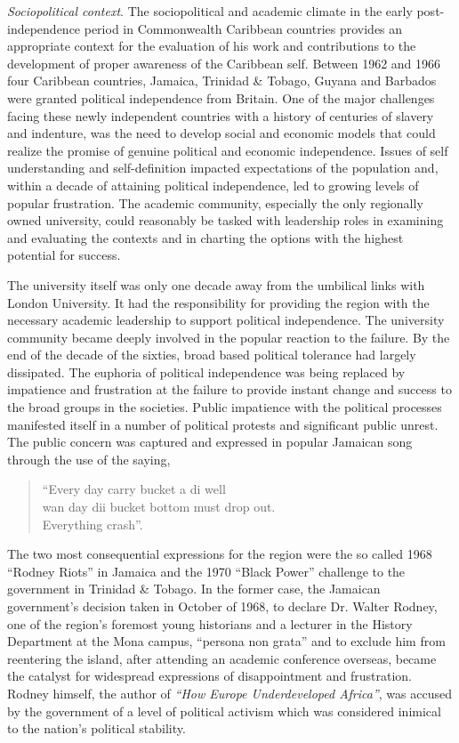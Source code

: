 \documentclass[output=paper, colorlinks,citecolor=brown]{langscibook}
\begin{document}
\textit{Sociopolitical context}. The sociopolitical and academic climate in the early post-independence period in Commonwealth Caribbean countries provides an appropriate context for the evaluation of his work and contributions to the development of proper awareness of the Caribbean self.
Between 1962 and 1966 four Caribbean countries, Jamaica, Trinidad \& Tobago, Guyana and Barbados were granted political independence from Britain. One of the major challenges facing these newly independent countries with a history of centuries of slavery and indenture, was the need to develop social and economic models that could realize the promise of genuine political and economic independence. Issues of self understanding and self-definition impacted expectations of the population and, within a decade of attaining political independence, led to growing levels of popular frustration. The academic community, especially the only regionally owned university, could reasonably be tasked with leadership roles in examining and evaluating the contexts and in charting the options with the highest potential for success. 

The university itself was only one decade away from the umbilical links with London University. It had the responsibility for providing the region with the necessary academic leadership to support political independence. The university community became deeply involved in the popular reaction to the failure. By the end of the decade of the sixties, broad based political tolerance had largely dissipated. The euphoria of political independence was being replaced by impatience and frustration at the failure to provide instant change and success to the broad groups in the societies.  Public impatience with the political processes manifested itself in a number of political protests and significant public unrest. The public concern was captured and expressed in popular Jamaican song through the use of the saying,
\begin{quote}
    “Every day carry bucket a di well\\ 
     wan day dii bucket bottom must drop out.\\ 
     Everything crash”.
\end{quote}
 

The two most consequential expressions for the region were the so called 1968 “Rodney Riots” in Jamaica and the 1970 “Black Power” challenge to the government in Trinidad \& Tobago. In the former case, the Jamaican government’s decision taken in October of 1968, to declare Dr. Walter Rodney, one of the region’s foremost young historians and a lecturer in the History Department at the Mona campus, “persona non grata” and to exclude him from reentering the island, after attending an academic conference overseas, became the catalyst for widespread expressions of disappointment and frustration. Rodney himself, the author of \textit{“How Europe Underdeveloped Africa”}, was accused by the government of a level of political activism which was considered inimical to the nation’s political stability. 
\end{document}
